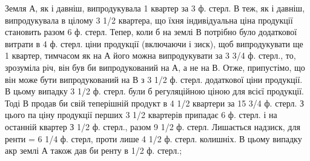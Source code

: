 Земля А, як і давніш, випродукувала 1 квартер за 3 ф. стерл. В теж,
як і давніш, випродукувала в цілому 3  1/2 квартера, що їхня індивідуальна ціна
продукції становить разом 6 ф. стерл. Тепер, коли б на землі В потрібно було
додаткової витрати в 4 ф. стерл. ціни продукції (включаючи і зиск), щоб випродукувати ще 1 квартер,
тимчасом як на А його можна випродукувати за
3 3/4 ф. стерл., то, зрозуміла річ, він був би випродукований на А, а не на В.
Отже, припустімо, що він може бути випродукований на В з 3  1/2 ф. стерл.
додаткової ціни продукції. В цьому випадку 3  1/2 ф. стерл. були б регуляційною ціною
для всієї продукції. Тоді В продав би свій теперішній продукт в 4  1/2 квартери за
15  3/4 ф. стерл. З цього па ціну продукції перших 3  1/2 квартерів припадає
6 ф. стерл. і на останній квартер З  1/2 ф. стерл., разом 9 1/2 ф. стерл. Лишається
надзиск, для ренти = 6  1/4 ф. стерл, проти лише 4  1/2 ф. стерл. колишніх.
В цьому випадку акр землі А також дав би ренту в 1/2 ф. стерл.;
